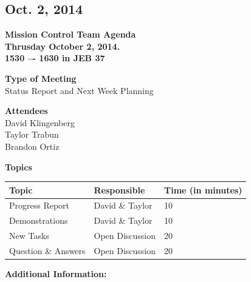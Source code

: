\documentclass[pdftex,11pt]{article}
\begin{document}
\clearpage


\subsection{Oct. 2, 2014}
{ \huge \bfseries Mission Control Team Agenda \\[0.4cm] }
{ \huge \bfseries Thrusday October 2, 2014.\\1530 –-  1630  in JEB 37\\[0.4cm] }
\vspace*{2.5mm}

{ \large \bfseries \hspace*{2 mm} Type of Meeting\\}
\hspace*{12 mm}  Status Report and  Next Week Planning
\vspace*{1.5mm}

{ \large \bfseries \hspace*{2 mm} Attendees\\}
\hspace*{12mm} David Klingenberg\\
\hspace*{12mm} Taylor Trabun\\
\hspace*{12mm} Brandon Ortiz\\
\vspace*{1.5mm}

{ \large \bfseries \noindent Topics}
\vspace*{2.5mm}

\begin{tabular}{| l | l | l |}
  \hline
  \bfseries Topic & \bfseries Responsible & \bfseries Time (in minutes) \\ \hline
  Progress Report  & David \& Taylor &  10 \\ \hline
  Demonstrations & David \& Taylor & 10 \\ \hline
  New Tasks & Open Discussion & 20 \\ \hline
  Question \&  Answers  & Open Discussion & 20 \\ 
  \hline
\end{tabular}

\vspace*{2.5mm}
{ \large \bfseries \noindent Additional Information:}
\end{document}
